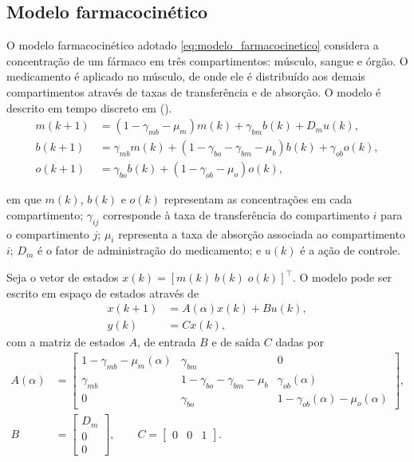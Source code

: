\subsection{Modelo farmacocinético}
\label{subsec:modelo}

O modelo farmacocinético adotado \eqref{eq:modelo_farmacocinetico} considera a concentração de um fármaco em três compartimentos: músculo, sangue e órgão. O medicamento é aplicado no músculo, de onde ele é distribuído aos demais compartimentos através de taxas de transferência e de absorção. O modelo é descrito em tempo discreto em (\cite{oliveira2024preliminary}).
\begin{subequations}\label{eq:modelo_farmacocinetico}
    \begin{align}
        m(k+1) &= (1-\gamma_{mb}-\mu_m)m(k)+\gamma_{bm}b(k)+D_m u(k),\label{eq:musculo}\\
        b(k+1) &= \gamma_{mb}m(k)+(1-\gamma_{bo}-\gamma_{bm}-\mu_b)b(k)+\gamma_{ob}o(k),\label{eq:sangue}\\
        o(k+1) &= \gamma_{bo}b(k)+(1-\gamma_{ob}-\mu_o)o(k),\label{eq:orgao}
    \end{align}
\end{subequations}

\noindent
em que $m(k)$, $b(k)$ e $o(k)$ representam as concentrações em cada compartimento; $\gamma_{ij}$ corresponde à taxa de transferência do compartimento $i$ para o compartimento $j$; $\mu_i$ representa a taxa de absorção associada ao compartimento $i$; $D_m$ é o fator de administração do medicamento; e $u(k)$ é a ação de controle.

Seja o vetor de estados $x(k)=[m(k)\;b(k)\;o(k)]^\top$. O modelo pode ser escrito em espaço de estados através de
\begin{subequations}\label{eq:representacao_em_estados_v1}
    \begin{align}
    x(k+1)&=A(\alpha)x(k)+Bu(k),\label{eq:planta_estados}\\
    y(k)&=Cx(k),\label{eq:planta_saida}
    \end{align}
\end{subequations}
com a matriz de estados $A$, de entrada $B$ e de saída $C$ dadas por
\begin{equation}
    \begin{aligned} A(\alpha)&=\begin{bmatrix}
    1-\gamma_{mb}-\mu_m(\alpha) & \gamma_{bm} & 0\\
    \gamma_{mb} & 1-\gamma_{bo}-\gamma_{bm}-\mu_b & \gamma_{ob}(\alpha)\\
    0 & \gamma_{bo} & 1-\gamma_{ob}(\alpha)-\mu_o(\alpha)
    \end{bmatrix},\\[0.4em]
    B&=\begin{bmatrix}D_m\\0\\0\end{bmatrix},\qquad
    C=\begin{bmatrix}0&0&1\end{bmatrix}.\end{aligned}
    \label{eq:matrizes_planta}
\end{equation}

